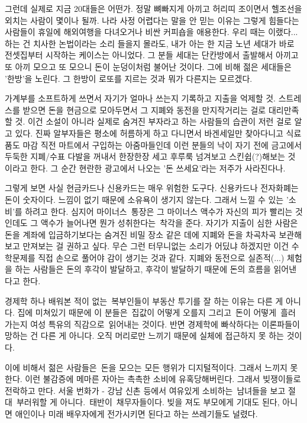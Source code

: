 그런데 실제로 지금 20대들은 어떤가. 정말 뼈빠지게 아끼고 허리띠 조이면서 헬조선을 외치는 사람이 몇이나 될까.
나라 사정 어렵다는 말을 안 믿는 이유는 그렇게 힘들다는 사람들이 휴일에 해외여행을 다녀오거나 비싼 커피숍을 애용한다.
우리 때는 이랬다... 하는 건 치사한 논법이라는 소리 들을지 몰라도, 내가 아는 한 지금 노년 세대가 바로 전셋집부터 시작하는 케이스는 아니었다.
그 분들 세대는 단칸방에서 출발해서 아끼고 또 아끼 모으고 또 모으니 돈이 눈덩이처럼 불어난 것이다.
그에 비해 젊은 세대들은 '한방'을 노린다. 그 한방이 로또를 지르는 것과 뭐가 다른지는 모르겠다.
\vspace{5mm}

가계부를 소프트하게 쓰면서 자기가 얼마나 쓰는지 기록하고 지출을 억제할 것.
스트레스를 받으면 돈을 현금으로 모아두면서 그 지폐와 동전을 만지작거리는 걸로 대리만족할 것.
이건 소설이 아니라 실제로 숨겨진 부자라고 하는 사람들의 습관이 저런 걸로 알고 있다.
진짜 알부자들은 평소에 허름하게 하고 다니면서 바겐세일만 찾아다니고 식료품도 마감 직전 마트에서 구입하는 아줌마들인데
이런 분들의 낙이 자기 전에 금고에서 두둑한 지폐/수표 다발을 꺼내서 한장한장 세고 후루룩 넘겨보고 스킨쉽(?)해보는 것이라고 한다.
그 순간 현란한 광고에서 나오는 '돈 쓰세요'라는 저주가 사라진다나.
\vspace{5mm}

그렇게 보면 사실 현금카드나 신용카드는 매우 위험한 도구다.
신용카드나 전자화폐는 돈이 숫자이다. 느낌이 없기 때문에 소유욕이 생기지 않는다. 그래서 느낄 수 있는 '소비'를 하려고 한다.
심지어 마이너스 통장은 그 마이너스 액수가 자신의 피가 빨리는 것인데도 그 액수가 늘어나면 뭔가 성취한다는 착각을 준다.
자기가 지출이 심한 사람은 돈을 계좌에 입금하기보다는 숨겨진 비밀 장소 같은 데에 지폐와 돈을 차곡차곡 보관해보고 만져보는 걸 권하고 싶다.
무슨 그런 터무니없는 소리가 어딨냐 하겠지만 이건 수학문제를 직접 손으로 풀어야 감이 생기는 것과 같다.
지폐와 동전으로 실존적(...) 체험을 하는 사람들은 돈의 후각이 발달하고, 후각이 발달하기 때문에 돈의 흐름을 읽어낸다고 한다.
\vspace{5mm}

경제학 하나 배워본 적이 없는 복부인들이 부동산 투기를 잘 하는 이유는 다른 게 아니다.
집에 미쳐있기 때문에 이 분들은 집값이 어떻게 오를지 그리고 돈이 어떻게 흘러가는지 여성 특유의 직감으로 읽어내는 것이다.
반면 경제학에 빠삭하다는 이론파들이 망하는 건 다른 게 아니다. 오직 머리로만 느끼기 때문에 실체에 접근하지 못 하는 것이다.
\vspace{5mm}

이에 비해서 젊은 사람들은 돈을 모으는 모든 행위가 디지털적이다. 그래서 느끼지 못 한다.
이런 불감증에 메마른 자아는 촉촉한 소비에 유혹당해버린다. 그래서 빚쟁이들로 전락하고 만다.
서울 번화가 - 강남 신촌 등에서 여유있게 소비하는 남녀들을 보고 절대 부러워할 게 아니다. 태반이 채무자들이다.
빚을 져도 부모에게 기대도 된다, 아니면 애인이나 미래 배우자에게 전가시키면 된다고 하는 쓰레기들도 널렸다.
\vspace{5mm}

